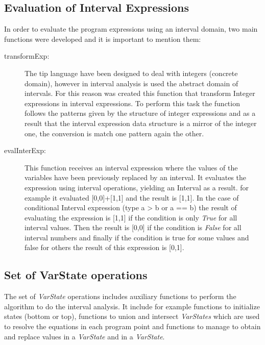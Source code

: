 \documentclass{article}
\begin{document}
\subsection{Evaluation of Interval Expressions}

In order to evaluate the program expressions using an interval domain, two main functions were developed and it is important to mention them:

\begin{description}
    \item[transformExp:] 
The tip language have been designed to deal with integers (concrete
domain), however in interval analysis is used the abstract domain of  intervals. For
this reason was created this function that transform Integer expressions in interval
expressions. To perform this task the function follows the patterns given by the structure of integer expressions and as a result that the interval expression data structure is a mirror of the integer one, the conversion is match one pattern again the other.

    \item[evalInterExp:] This function receives an interval expression where the values of the variables have been previously replaced by an interval. It evaluates the expression using interval operations, yielding an Interval as a result. for example it evaluated [0,0]+[1,1] and the result is [1,1].
 In the case of conditional Interval expression (type a > b or a == b) the result of evaluating the expression is [1,1] if the condition is only  \emph{ True } for all interval values. Then the result is [0,0] if the condition is \emph{ False } for all interval numbers and finally if the condition is true for some values and false for others the result of this expression is [0,1].


\end{description}


\subsection{Set of VarState operations}
The set of \emph{ VarState } operations includes auxiliary functions to perform the algorithm
to do the interval analysis. It include for example functions 
to initialize states (bottom or top), functions to union
and intersect \emph{ VarStates } which are used to resolve the equations in each program point and functions to manage to obtain and replace values in a  \emph{ VarState} and in a \emph{ VarState}.
\end{document}
